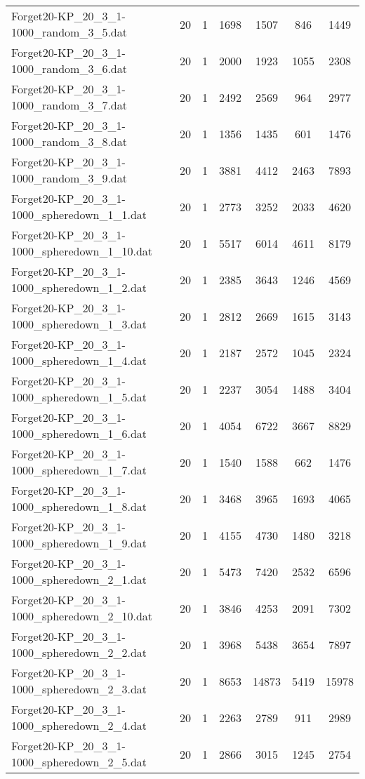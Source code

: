 \begin{table}[!ht]
\begin{tabular}{lcccccc}
Forget20-KP\_20\_3\_1-1000\_random\_3\_5.dat & 20 & 1 & 1698 & 1507 & 846 & 1449 \\
Forget20-KP\_20\_3\_1-1000\_random\_3\_6.dat & 20 & 1 & 2000 & 1923 & 1055 & 2308 \\
Forget20-KP\_20\_3\_1-1000\_random\_3\_7.dat & 20 & 1 & 2492 & 2569 & 964 & 2977 \\
Forget20-KP\_20\_3\_1-1000\_random\_3\_8.dat & 20 & 1 & 1356 & 1435 & 601 & 1476 \\
Forget20-KP\_20\_3\_1-1000\_random\_3\_9.dat & 20 & 1 & 3881 & 4412 & 2463 & 7893 \\
Forget20-KP\_20\_3\_1-1000\_spheredown\_1\_1.dat & 20 & 1 & 2773 & 3252 & 2033 & 4620 \\
Forget20-KP\_20\_3\_1-1000\_spheredown\_1\_10.dat & 20 & 1 & 5517 & 6014 & 4611 & 8179 \\
Forget20-KP\_20\_3\_1-1000\_spheredown\_1\_2.dat & 20 & 1 & 2385 & 3643 & 1246 & 4569 \\
Forget20-KP\_20\_3\_1-1000\_spheredown\_1\_3.dat & 20 & 1 & 2812 & 2669 & 1615 & 3143 \\
Forget20-KP\_20\_3\_1-1000\_spheredown\_1\_4.dat & 20 & 1 & 2187 & 2572 & 1045 & 2324 \\
Forget20-KP\_20\_3\_1-1000\_spheredown\_1\_5.dat & 20 & 1 & 2237 & 3054 & 1488 & 3404 \\
Forget20-KP\_20\_3\_1-1000\_spheredown\_1\_6.dat & 20 & 1 & 4054 & 6722 & 3667 & 8829 \\
Forget20-KP\_20\_3\_1-1000\_spheredown\_1\_7.dat & 20 & 1 & 1540 & 1588 & 662 & 1476 \\
Forget20-KP\_20\_3\_1-1000\_spheredown\_1\_8.dat & 20 & 1 & 3468 & 3965 & 1693 & 4065 \\
Forget20-KP\_20\_3\_1-1000\_spheredown\_1\_9.dat & 20 & 1 & 4155 & 4730 & 1480 & 3218 \\
Forget20-KP\_20\_3\_1-1000\_spheredown\_2\_1.dat & 20 & 1 & 5473 & 7420 & 2532 & 6596 \\
Forget20-KP\_20\_3\_1-1000\_spheredown\_2\_10.dat & 20 & 1 & 3846 & 4253 & 2091 & 7302 \\
Forget20-KP\_20\_3\_1-1000\_spheredown\_2\_2.dat & 20 & 1 & 3968 & 5438 & 3654 & 7897 \\
Forget20-KP\_20\_3\_1-1000\_spheredown\_2\_3.dat & 20 & 1 & 8653 & 14873 & 5419 & 15978 \\
Forget20-KP\_20\_3\_1-1000\_spheredown\_2\_4.dat & 20 & 1 & 2263 & 2789 & 911 & 2989 \\
Forget20-KP\_20\_3\_1-1000\_spheredown\_2\_5.dat & 20 & 1 & 2866 & 3015 & 1245 & 2754 \\

\end{tabular}
\end{table}
